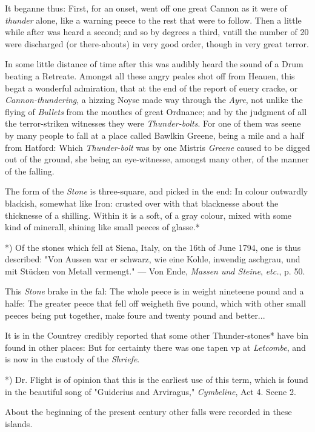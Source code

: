 \documentclass[a4paper, 12pt, oneside, polutonikogreek, english]{article}
\begin{document}
It beganne thus: First, for an onset, went off one great Cannon as it were of \emph{thunder} alone, like a warning peece to the rest that were to follow. Then a little while after was heard a second; and so by degrees a third, vntill the number of 20 were discharged (or there-abouts) in very good order, though in very great terror.

In some little distance of time after this was audibly heard the sound of a Drum beating a Retreate. Amongst all these angry peales shot off from Heauen, this begat a wonderful admiration, that at the end of the report of euery cracke, or \emph{Cannon-thundering}, a hizzing Noyse made way through the \emph{Ayre}, not unlike the flying of \emph{Bullets} from the mouthes of great Ordnance; and by the judgment of all the terror-striken witnesses they were \emph{Thunder-bolts}. For one of them was seene by many people to fall at a place called Bawlkin Greene, being a mile and a half from Hatford: Which \emph{Thunder-bolt} was by one Mistris \emph{Greene} caused to be digged out of the ground, she being an eye-witnesse, amongst many other, of the manner of the falling.

The form of the \emph{Stone} is three-square, and picked in the end: In colour outwardly blackish, somewhat like Iron: crusted over with that blacknesse about the thicknesse of a shilling. Within it is a soft, of a gray colour, mixed with some kind of minerall, shining like small peeces of glasse.*

*) Of the stones which fell at Siena, Italy, on the 16th of June 1794, one is thus described: "Von Aussen war er schwarz, wie eine Kohle, inwendig aschgrau, und mit Stücken von Metall vermengt." --- Von Ende, \emph{Massen und Steine}, \emph{etc.}, p. 50.

This \emph{Stone} brake in the fal: The whole peece is in weight nineteene pound and a halfe: The greater peece that fell off weigheth five pound, which with other small peeces being put together, make foure and twenty pound and better...

It is in the Countrey credibly reported that some other Thunder-stones* have bin found in other places: But for certainty there was one tapen vp at \emph{Letcombe}, and is now in the custody of the \emph{Shriefe}.

*) Dr. Flight is of opinion that this is the earliest use of this term, which is found in the beautiful song of "Guiderius and Arviragus," \emph{Cymbeline}, Act 4. Scene 2.

About the beginning of the present century other falls were recorded in these islands.
\end{document}
